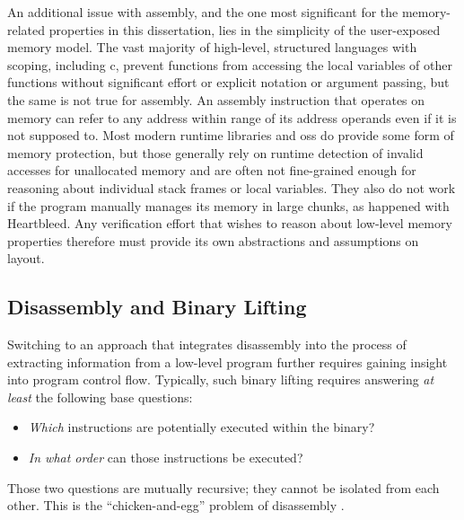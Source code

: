 An additional issue with assembly, and the one most significant for the memory-related properties in this dissertation, lies in the simplicity of the user-exposed memory model.
The vast majority of high-level, structured languages with scoping, including \gls{c}, prevent functions from accessing the local variables of other functions without significant effort or explicit notation or argument passing, but the same is not true for assembly.
An assembly instruction that operates on memory can refer to any address within range of its address operands even if it is not supposed to.
Most modern runtime libraries and \acp{os} do provide some form of memory protection, but those generally rely on runtime detection of invalid accesses for unallocated memory and are often not fine-grained enough for reasoning about individual stack frames or local variables.
They also do not work if the program manually manages its memory in large chunks, as happened with Heartbleed.
Any verification effort that wishes to reason about low-level memory properties therefore must provide its own abstractions and assumptions on layout.

\subsection{Disassembly and Binary Lifting}\label{challenges-disassembly}
Switching to an approach that integrates disassembly into the process of extracting information from a low-level program further requires gaining insight into program control flow.
Typically, such binary lifting requires answering \emph{at least} the following base questions:
\begin{itemize}
  \item \emph{Which} instructions are potentially executed within the binary?
  \item \emph{In what order} can those instructions be executed?
\end{itemize}
Those two questions are mutually recursive; they cannot be isolated from each other.
This is the ``chicken-and-egg'' problem of disassembly \autocite{schwartz2002disassembly}.


